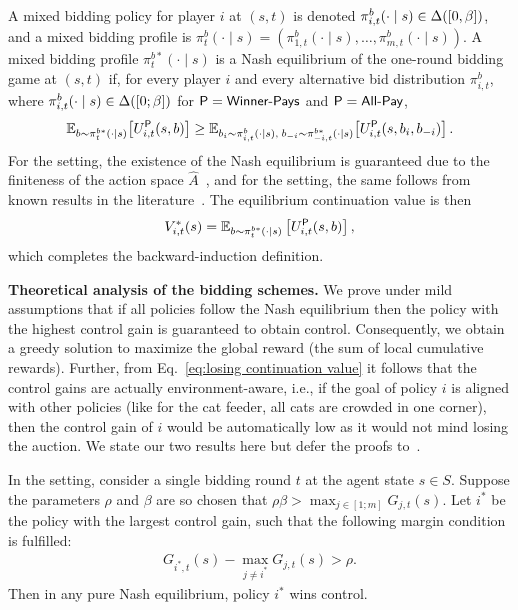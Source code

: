 A mixed bidding policy for player \(i\) at \((s,t)\) is denoted \(\pi^b_{i,t}(\cdot\mid s)\in\Delta([0,\beta])\), and a mixed bidding profile is \(\pi^b_t(\cdot\mid s)=(\pi^b_{1,t}(\cdot\mid s),\ldots,\pi^b_{m,t}(\cdot\mid s))\).
A mixed bidding profile \(\pi^{b*}_t(\cdot\mid s)\) is a Nash equilibrium of the one-round bidding game at \((s,t)\) if, for every player \(i\) and every alternative bid distribution $\pi^b_{i,t}$, where \(\pi^b_{i,t}(\cdot\mid s)\in\Delta([0;\beta])\) for $\mathsf{P}=\textsf{Winner-Pays}$ and $\mathsf{P}=\textsf{All-Pay}$,
\begin{equation}
	\mathbb{E}_{b\sim\pi^{b*}_t(\cdot\mid s)}\!\left[U^{\mathsf{P}}_{i,t}(s,b)\right]
	\geq
	\mathbb{E}_{b_i\sim\pi^b_{i,t}(\cdot\mid s),\; b_{-i}\sim\pi^{b*}_{-i,t}(\cdot\mid s)}\!\left[U^{\mathsf{P}}_{i,t}(s,b_i,b_{-i})\right].
\end{equation}
For the \poorman setting, the existence of the Nash equilibrium is guaranteed due to the finiteness of the action space $\hat A$~\citep{nash1951noncooperative}, and for the \allpay setting, the same follows from known results in the literature~\citep{baye1996all}.
The equilibrium continuation value is then
\begin{equation}
	V^*_{i,t}(s)
	=
	\mathbb{E}_{b\sim \pi^{b*}_t(\cdot\mid s)}\left[U^{\mathsf{P}}_{i,t}(s,b)\right],
\end{equation}
which completes the backward-induction definition.

\smallskip
\noindent\textbf{Theoretical analysis of the bidding schemes.}
We prove under mild assumptions that if all policies follow the Nash equilibrium then the policy with the highest control gain is guaranteed to obtain control.
Consequently, we obtain a greedy solution to maximize the global reward (the sum of local cumulative rewards).
Further, from Eq.~\eqref{eq:losing continuation value} it follows that the control gains are actually environment-aware, i.e., if the goal of policy $i$ is aligned with other policies (like for the cat feeder, all cats are crowded in one corner), then the control gain of $i$ would be automatically low as it would not mind losing the auction.
We state our two results here but defer the proofs to~.


\begin{theorem}\label{thm:poorman-favors-high-control-gain}
	In the \poorman setting, consider a single bidding round $t$ at the agent state $s\in S$.
  	Suppose the parameters $\rho$ and $\beta$ are so chosen that $\rho\beta > \max_{j\in [1;m]}G_{j,t}(s)$.
	Let $i^*$ be the policy with the largest control gain, such that the following margin condition is fulfilled:
	\begin{align}\label{eq:all pay:gross gain gap}
		G_{i^*,t}(s) - \max_{j\neq i^*}G_{j,t}(s) > \rho.
	\end{align}
	Then in any pure Nash equilibrium, policy $i^*$ wins control.
\end{theorem}

